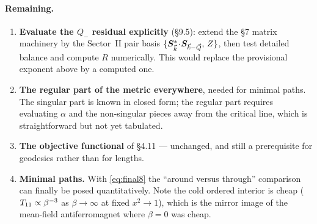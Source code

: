 \paragraph{Remaining.}
\begin{enumerate}
  \item \textbf{Evaluate the $Q_-$ residual explicitly} (\S9.5): extend the \S7 matrix
        machinery by the Sector~II pair basis
        $\{\bm S^{*}_{\vec k}\!\cdot\!\bm S_{\vec k-\vec Q},\,Z\}$, then test detailed balance and
        compute $R$ numerically. This would replace the provisional exponent above by a
        computed one.
  \item \textbf{The regular part of the metric everywhere}, needed for minimal paths.
        The singular part is known in closed form; the regular part requires evaluating
        $\alpha$ and the non-singular pieces away from the critical line, which is
        straightforward but not yet tabulated.
  \item \textbf{The objective functional} of \S4.11 --- unchanged, and still a prerequisite
        for geodesics rather than for lengths.
  \item \textbf{Minimal paths.} With \eqref{eq:final8} the ``around versus through''
        comparison can finally be posed quantitatively. Note the cold ordered interior is
        cheap ($T_{11}\propto\beta^{-3}$ as $\beta\to\infty$ at fixed $x^{2}\to1$), which
        is the mirror image of the mean-field antiferromagnet where $\beta=0$ was cheap.
\end{enumerate}


